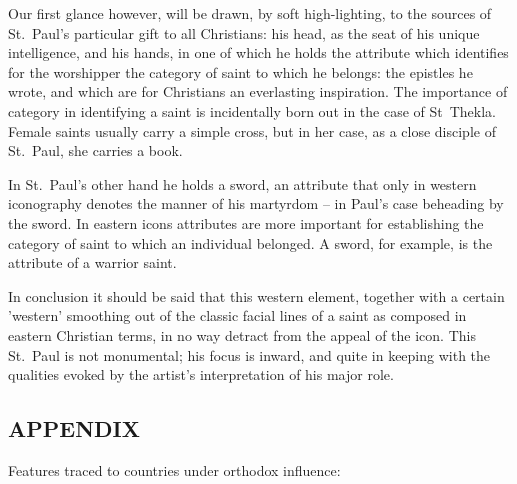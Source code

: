 \documentclass[a4paper,12pt]{article}
\begin{document}
Our first glance however, will be drawn, by soft high-lighting, to the
sources of St.~Paul's particular gift to all Christians: his head, as
the seat of his unique intelligence, and his hands, in one of which he
holds the attribute which identifies for the worshipper the category
of saint to which he belongs: the epistles he wrote, and which are for
Christians an everlasting inspiration.  The importance of category in
identifying a saint is incidentally born out in the case of St~Thekla.
Female saints usually carry a simple cross, but in her case, as a
close disciple of St.~Paul, she carries a book.

In St.~Paul's other hand he holds a sword, an attribute that only in
western iconography denotes the manner of his martyrdom – in Paul's
case beheading by the sword.  In eastern icons attributes are more
important for establishing the category of saint to which an
individual belonged.  A sword, for example, is the attribute of a
warrior saint.

In conclusion it should be said that this western element, together
with a certain 'western' smoothing out of the classic facial lines of
a saint as composed in eastern Christian terms, in no way detract from
the appeal of the icon.  This St.~Paul is not monumental; his focus is
inward, and quite in keeping with the qualities evoked by the artist's
interpretation of his major role.

\subsection*{APPENDIX} %

Features traced to countries under orthodox influence:
\end{document}
